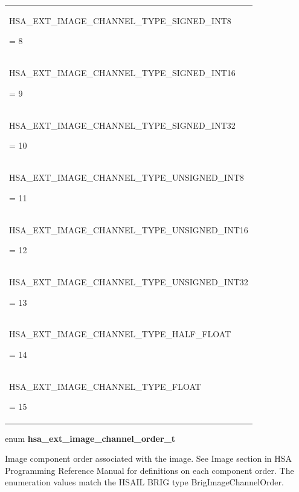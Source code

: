\documentclass[final]{book}
\newcommand{\reftyp}[1]{#1}
\newcommand{\refenu}[1]{\reftyp{#1}}
\begin{document}
\begin{longtable}{@{\hspace{2em}}p{\linewidth-2em}}
\hspace{-2em}\hypertarget{group__images_1ggaa143aa6feeaf24103b886c571ace568fa39b7795d032ee6afc6c701b25632b7c0}{\refenu{HSA_EXT_IMAGE_CHANNEL_TYPE_SIGNED_INT8}} = 8\\[2mm]
\hspace{-2em}\hypertarget{group__images_1ggaa143aa6feeaf24103b886c571ace568fa94b5591edcfac1939f541c48a6f84400}{\refenu{HSA_EXT_IMAGE_CHANNEL_TYPE_SIGNED_INT16}} = 9\\[2mm]
\hspace{-2em}\hypertarget{group__images_1ggaa143aa6feeaf24103b886c571ace568fab58308c224a7d513ecbf0ffd51846ff2}{\refenu{HSA_EXT_IMAGE_CHANNEL_TYPE_SIGNED_INT32}} = 10\\[2mm]
\hspace{-2em}\hypertarget{group__images_1ggaa143aa6feeaf24103b886c571ace568fad5a41c0a19a7cb34f4343db6cf757b7a}{\refenu{HSA_EXT_IMAGE_CHANNEL_TYPE_UNSIGNED_INT8}} = 11\\[2mm]
\hspace{-2em}\hypertarget{group__images_1ggaa143aa6feeaf24103b886c571ace568fa1779271b7ca06132b05918e5a72a2a85}{\refenu{HSA_EXT_IMAGE_CHANNEL_TYPE_UNSIGNED_INT16}} = 12\\[2mm]
\hspace{-2em}\hypertarget{group__images_1ggaa143aa6feeaf24103b886c571ace568faf925e28a04ef0162badd74c43b324ec5}{\refenu{HSA_EXT_IMAGE_CHANNEL_TYPE_UNSIGNED_INT32}} = 13\\[2mm]
\hspace{-2em}\hypertarget{group__images_1ggaa143aa6feeaf24103b886c571ace568fa71200bfc55d6373e117594a624472973}{\refenu{HSA_EXT_IMAGE_CHANNEL_TYPE_HALF_FLOAT}} = 14\\[2mm]
\hspace{-2em}\hypertarget{group__images_1ggaa143aa6feeaf24103b886c571ace568fa4b06498e72cfae3bffd55e5c7a483576}{\refenu{HSA_EXT_IMAGE_CHANNEL_TYPE_FLOAT}} = 15
\end{longtable}

\noindent\begin{tcolorbox}[breakable,nobeforeafter,arc=0mm,colframe=white,colback=lightgray,left=0mm]
enum \hypertarget{group__images_1gabaced4fb1f3b9fdaa978e143af5ff055}{\textbf{hsa_ext_image_channel_order_t}}
\end{tcolorbox}
Image component order associated with the image. See Image section in HSA Programming Reference Manual for definitions on each component order. The enumeration values match the HSAIL BRIG type BrigImageChannelOrder.
\end{document}
